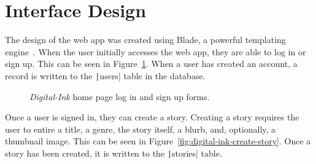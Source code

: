 \clearpage
\section{Interface Design}\label{sec:interface}

The design of the web app was created using Blade, a powerful templating engine~\parencite{laravel2022blade}.
When the user initially accesses the web app, they are able to log in or sign up.
This can be seen in Figure~\ref{fig:digital-ink-home-and-sign-up}.
When a user has created an account, a record is written to the \texttt|users| table in the database.

\begin{figure}[!htbp]
    \centering
    \hfill
    \caption{\textit{Digital-Ink} home page log in and sign up forms.}
    \label{fig:digital-ink-home-and-sign-up}
\end{figure}

\clearpage
Once a user is signed in, they can create a story.
Creating a story requires the user to entire a title, a genre, the story itself, a blurb, and, optionally, a thumbnail
image.
This can be seen in Figure~\ref{fig:digital-ink-create-story}.
Once a story has been created, it is written to the \texttt|stories| table.

